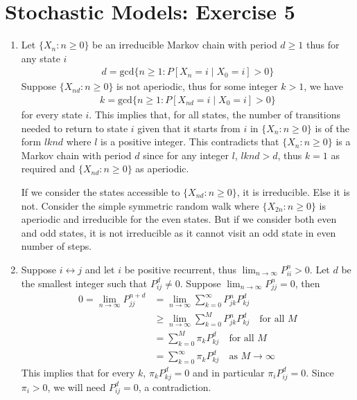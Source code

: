 \documentclass[a4paper,10pt]{article}
\theoremstyle{definition}
\begin{document}
\section*{Stochastic Models: Exercise 5}

\begin{enumerate}
\item Let $\{X_n: n\geq 0\}$ be an irreducible Markov chain with period $d \geq 1$ thus for any state $i$
\begin{align*}
d=\text{gcd}\{n\geq 1: P\left[X_n=i\mid X_0=i\right]>0\}
\end{align*}
Suppose $\{X_{nd}:n\geq 0\}$ is not aperiodic, thus for some integer $k>1$, we have
\begin{align*}  
k=\text{gcd}\{n\geq 1: P\left[X_{nd}=i\mid X_0=i\right]>0\}
\end{align*}
for every state $i$. This implies that, for all states, the number of transitions needed to return to state $i$ given that it starts from $i$ in $\{X_n: n\geq 0\}$ is of the form $lknd$ where $l$ is a positive integer. This contradicts that $\{X_n: n\geq 0\}$ is a Markov chain with period $d$ since for any integer $l$, $lknd>d$, thus $k=1$ as required and $\{X_{nd}: n\geq 0\}$ as aperiodic.

If we consider the states accessible to $\{X_{nd}: n\geq 0\}$, it is irreducible. Else it is not. Consider the simple symmetric random walk where $\{X_{2n}: n\geq 0\}$ is aperiodic and irreducible for the even states. But if we consider both even and odd states, it is not irreducible as it cannot visit an odd state in even number of steps.

\item Suppose $i \leftrightarrow j$ and let $i$ be positive recurrent, thus $\lim_{n\to\infty}P^n_{ii}>0$. Let $d$ be the smallest integer such that $P^d_{ij}\neq 0$. Suppose $\lim_{n\to\infty}P^n_{jj}=0$, then
\begin{align*}
0=\lim_{n\to\infty}P^{n+d}_{jj}&=\lim_{n\to\infty}\sum_{k=0}^{\infty}P^n_{jk}P^d_{kj}\\
&\geq\lim_{n\to\infty}\sum_{k=0}^{M}P^n_{jk}P^d_{kj} \quad \text{for all $M$}\\
&=\sum_{k=0}^{M}\pi_{k}P^d_{kj} \quad \text{for all $M$}\\
&=\sum_{k=0}^{\infty}\pi_{k}P^d_{kj} \quad \text{as $M \to\infty$}
\end{align*}
This implies that for every $k$, $\pi_kP^d_{kj}=0$ and in particular $\pi_iP^d_{ij}=0$. Since $\pi_i >0$, we will need $P^d_{ij}=0$, a contradiction.


\end{enumerate}
\end{document}
